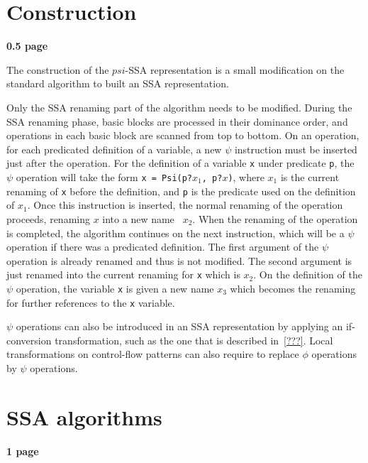 \section{Construction}

\textbf{0.5 page}


The construction of the $psi$-SSA representation is a small
modification on the standard algorithm to built an SSA representation.

Only the SSA renaming part of the algorithm needs to be modified.
During the SSA renaming phase, basic blocks are processed in their
dominance order, and operations in each basic block are scanned from
top to bottom. On an operation, for each predicated definition of a
variable, a new $\psi$ instruction must be inserted just after the
operation. For the definition of a variable {\tt x} under predicate
{\tt p}, the $\psi$ operation will take the form {\tt x = Psi(p?$x_1$,
  p?$x$)}, where {\tt $x_1$} is the current renaming of {\tt x} before
the definition, and {\tt p} is the predicate used on the definition of
{\tt $x_1$}. Once this instruction is inserted, the normal renaming of
the operation proceeds, renaming {\tt $x$} into a new name {\tt
  $x_2$}. When the renaming of the operation is completed, the algorithm
continues on the next instruction, which will be a $\psi$ operation if
there was a predicated definition. The first argument of the $\psi$
operation is already renamed and thus is not modified. The second
argument is just renamed into the current renaming for {\tt x} which
is {\tt $x_2$}. On the definition of the $\psi$ operation, the variable
{\tt x} is given a new name {\tt $x_3$} which becomes the renaming for
further references to the {\tt x} variable.

$\psi$ operations can also be introduced in an SSA representation by
applying an if-conversion transformation, such as the one that is
described in~\ref{???}. Local transformations on control-flow patterns
can also require to replace $\phi$ operations by $\psi$ operations.

\section{SSA algorithms}

\textbf{1 page}

